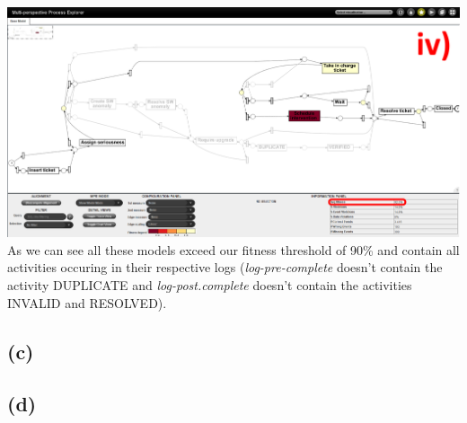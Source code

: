 \documentclass[../../main.tex]{subfiles}
\begin{document}
\includegraphics[width=0.5\columnwidth]{img/ProM_b_1iv.png}
As we can see all these models exceed our fitness threshold of 90\% and contain all activities occuring in their respective logs (\textit{log-pre-complete} doesn't contain the activity DUPLICATE and \textit{log-post.complete} doesn't contain the activities INVALID and RESOLVED).


\subsection*{(c)}


\subsection*{(d)}
\end{document}
